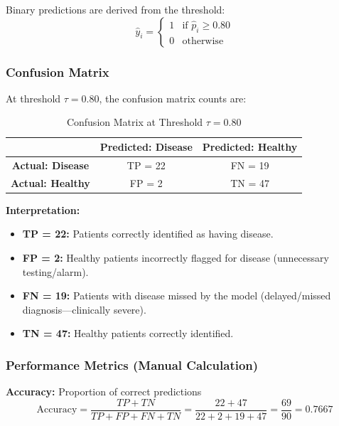 \documentclass[11pt]{article}
\begin{document}
Binary predictions are derived from the threshold:
\begin{equation}
    \hat{y}_i = \begin{cases} 1 & \text{if } \hat{p}_i \geq 0.80 \\ 0 & \text{otherwise} \end{cases}
\end{equation}

\subsubsection{Confusion Matrix}

At threshold $\tau = 0.80$, the confusion matrix counts are:

\begin{table}[H]
    \centering
    \caption{Confusion Matrix at Threshold $\tau = 0.80$}
    \begin{tabular}{ccc}
        \toprule
        & \textbf{Predicted: Disease} & \textbf{Predicted: Healthy} \\
        \midrule
        \textbf{Actual: Disease}   & TP = 22 & FN = 19 \\
        \textbf{Actual: Healthy}   & FP = 2  & TN = 47 \\
        \bottomrule
    \end{tabular}
    \label{tab:confusion_0_80}
\end{table}

\textbf{Interpretation:}
\begin{itemize}
    \item \textbf{TP = 22:} Patients correctly identified as having disease.
    \item \textbf{FP = 2:} Healthy patients incorrectly flagged for disease (unnecessary testing/alarm).
    \item \textbf{FN = 19:} Patients with disease missed by the model (delayed/missed diagnosis—clinically severe).
    \item \textbf{TN = 47:} Healthy patients correctly identified.
\end{itemize}

\subsubsection{Performance Metrics (Manual Calculation)}

\textbf{Accuracy:} Proportion of correct predictions
\begin{equation}
    \text{Accuracy} = \frac{TP + TN}{TP + FP + FN + TN} = \frac{22 + 47}{22 + 2 + 19 + 47} = \frac{69}{90} = 0.7667
\end{equation}
\end{document}
